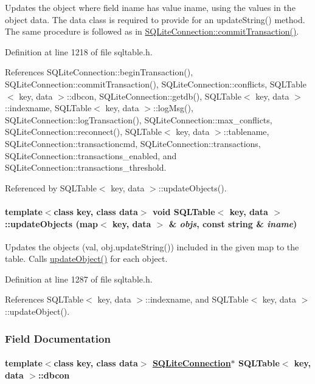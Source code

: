 Updates the object where field iname has value iname, using the values in the object data. The data class is required to provide for an update\-String() method. The same procedure is followed as in \hyperlink{classSQLiteConnection_SQLiteConnectiona7}{SQLite\-Connection::commit\-Transaction()}. 

Definition at line 1218 of file sqltable.h.

References SQLite\-Connection::begin\-Transaction(), SQLite\-Connection::commit\-Transaction(), SQLite\-Connection::conflicts, SQLTable$<$ key, data $>$::dbcon, SQLite\-Connection::getdb(), SQLTable$<$ key, data $>$::indexname, SQLTable$<$ key, data $>$::log\-Msg(), SQLite\-Connection::log\-Transaction(), SQLite\-Connection::max\_\-conflicts, SQLite\-Connection::reconnect(), SQLTable$<$ key, data $>$::tablename, SQLite\-Connection::transactioncmd, SQLite\-Connection::transactions, SQLite\-Connection::transactions\_\-enabled, and SQLite\-Connection::transactions\_\-threshold.

Referenced by SQLTable$<$ key, data $>$::update\-Objects().\hypertarget{classSQLTable_SQLTablea21}{
\paragraph[updateObjects]{\setlength{\rightskip}{0pt plus 5cm}template$<$class key, class data$>$ void SQLTable$<$ key, data $>$::update\-Objects (map$<$ key, data $>$ \& {\em objs}, const string \& {\em iname})}\hfill}
\label{classSQLTable_SQLTablea21}


Updates the objects (val, obj.update\-String()) included in the given map to the table. Calls \hyperlink{classSQLTable_SQLTablea20}{update\-Object()} for each object. 

Definition at line 1287 of file sqltable.h.

References SQLTable$<$ key, data $>$::indexname, and SQLTable$<$ key, data $>$::update\-Object().

\subsubsection{Field Documentation}
\hypertarget{classSQLTable_SQLTableo1}{
\paragraph[dbcon]{\setlength{\rightskip}{0pt plus 5cm}template$<$class key, class data$>$ \hyperlink{classSQLiteConnection}{SQLite\-Connection}$\ast$ SQLTable$<$ key, data $>$::dbcon}\hfill}
\label{classSQLTable_SQLTableo1}




